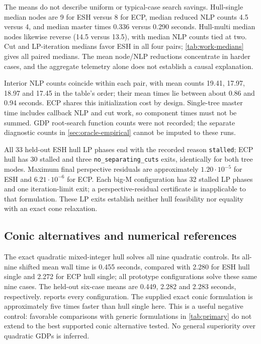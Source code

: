 The means do not describe uniform or typical-case search savings. Hull-single median nodes are 9 for ESH versus 8 for ECP, median reduced NLP counts 4.5 versus 4, and median master times 0.336 versus 0.290 seconds. Hull-multi median nodes likewise reverse (14.5 versus 13.5), with median NLP counts tied at two. Cut and LP-iteration medians favor ESH in all four pairs; \cref{tab:work-medians} gives all paired medians. The mean node/NLP reductions concentrate in harder cases, and the aggregate telemetry alone does not establish a causal explanation.

Interior NLP counts coincide within each pair, with mean counts 19.41, 17.97, 18.97 and 17.45 in the table's order; their mean times lie between about 0.86 and 0.94 seconds. ECP shares this initialization cost by design. Single-tree master time includes callback NLP and cut work, so component times must not be summed. GDP root-search function counts were not recorded; the separate diagnostic counts in \cref{sec:oracle-empirical} cannot be imputed to these runs.

All 33 held-out ESH hull LP phases end with the recorded reason \texttt{stalled}; ECP hull has 30 stalled and three \texttt{no\_separating\_cuts} exits, identically for both tree modes. Maximum final perspective residuals are approximately $1.20\cdot10^{-5}$ for ESH and $6.21\cdot10^{-6}$ for ECP. Each big-M configuration has 32 stalled LP phases and one iteration-limit exit; a perspective-residual certificate is inapplicable to that formulation. These LP exits establish neither hull feasibility nor equality with an exact cone relaxation.

\subsection{Conic alternatives and numerical references}\label{sec:conic-results}
The exact quadratic mixed-integer hull solves all nine quadratic controls. Its all-nine shifted mean wall time is 0.455 seconds, compared with 2.280 for ESH hull single and 2.272 for ECP hull single; all prototype configurations solve these same nine cases. The held-out six-case means are 0.449, 2.282 and 2.283 seconds, respectively.  reports every configuration. The supplied exact conic formulation is approximately five times faster than hull single here. This is a useful negative control: favorable comparisons with generic formulations in \cref{tab:primary} do not extend to the best supported conic alternative tested. No general superiority over quadratic GDPs is inferred.

